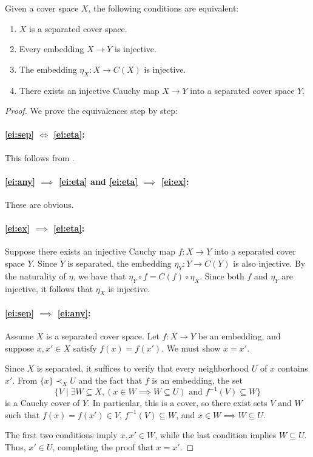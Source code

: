 \documentclass[pdflatex,sn-mathphys-num]{sn-jnl}
\theoremstyle{definition}
\theoremstyle{remark}
\numberwithin{figure}{section}
\newcommand{\rb}{\prec}
\begin{document}
\begin{prop}
Given a cover space $X$, the following conditions are equivalent:
\begin{enumerate}
\item \label{ei:sep} $X$ is a separated cover space.
\item \label{ei:any} Every embedding $X \to Y$ is injective.
\item \label{ei:eta} The embedding $\eta_X : X \to C(X)$ is injective.
\item \label{ei:ex} There exists an injective Cauchy map $X \to Y$ into a separated cover space $Y$.
\end{enumerate}
\end{prop}
\begin{proof}
We prove the equivalences step by step:

\paragraph{\eqref{ei:sep} $\iff$ \eqref{ei:eta}:} This follows from .

\paragraph{\eqref{ei:any} $\implies$ \eqref{ei:eta} and \eqref{ei:eta} $\implies$ \eqref{ei:ex}:} These are obvious.

\paragraph{\eqref{ei:ex} $\implies$ \eqref{ei:eta}:}
Suppose there exists an injective Cauchy map $f : X \to Y$ into a separated cover space $Y$.
Since $Y$ is separated, the embedding $\eta_Y : Y \to C(Y)$ is also injective.
By the naturality of $\eta$, we have that $\eta_Y \circ f = C(f) \circ \eta_X$.
Since both $f$ and $\eta_Y$ are injective, it follows that $\eta_X$ is injective.

\paragraph{\eqref{ei:sep} $\implies$ \eqref{ei:any}:}
Assume $X$ is a separated cover space.
Let $f : X \to Y$ be an embedding, and suppose $x,x' \in X$ satisfy $f(x) = f(x')$.
We must show $x = x'$.

Since $X$ is separated, it suffices to verify that every neighborhood $U$ of $x$ contains $x'$.
From $\{x\} \rb_X U$ and the fact that $f$ is an embedding, the set 
\[
\{ V \mid \exists W \subseteq X, (x \in W \implies W \subseteq U) \text{ and } f^{-1}(V) \subseteq W \}
\]
is a Cauchy cover of $Y$.
In particular, this is a cover, so there exist sets $V$ and $W$ such that $f(x) = f(x') \in V$, $f^{-1}(V) \subseteq W$, and $x \in W \implies W \subseteq U$.

The first two conditions imply $x, x' \in W$, while the last condition implies $W \subseteq U$.
Thus, $x' \in U$, completing the proof that $x = x'$.
\end{proof}
\end{document}
